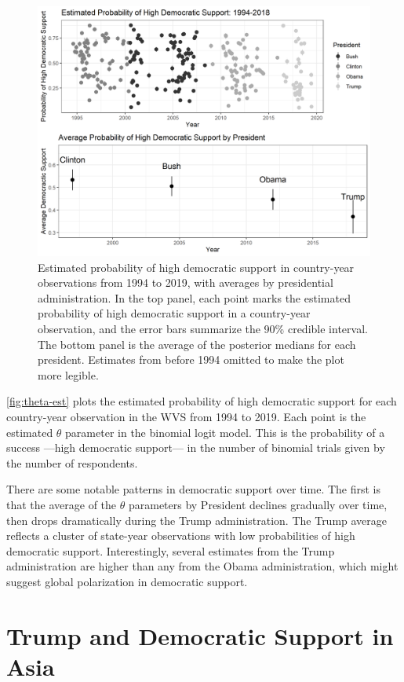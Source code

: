 \documentclass[12pt]{article}
\begin{document}
\begin{figure}
\includegraphics[width = .95\textwidth]{theta-est.png}
\caption{Estimated probability of high democratic support in country-year observations from 1994 to 2019, with averages by presidential administration. In the top panel, each point marks the estimated probability of high democratic support in a country-year observation, and the error bars summarize the 90\% credible interval. The bottom panel is the average of the posterior medians for each president. Estimates from before 1994 omitted to make the plot more legible.  }
\label{fig:theta-est} 
\end{figure}


\autoref{fig:theta-est} plots the estimated probability of high democratic support for each country-year observation in the WVS from 1994 to 2019. 
Each point is the estimated $\theta$ parameter in the binomial logit model.
This is the probability of a success ---high democratic support--- in the number of binomial trials given by the number of respondents. 


There are some notable patterns in democratic support over time.
The first is that the average of the $\theta$ parameters by President declines gradually over time, then drops dramatically during the Trump administration.  
The Trump average reflects a cluster of state-year observations with low probabilities of high democratic support. 
Interestingly, several estimates from the Trump administration are higher than any from the Obama administration, which might suggest global polarization in democratic support. 


\section{Trump and Democratic Support in Asia}
\end{document}
